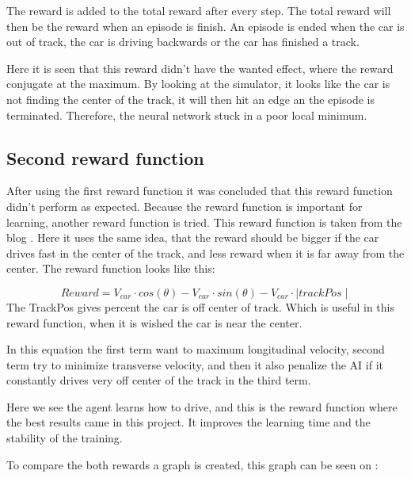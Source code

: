 The reward is added to the total reward after every step. The total reward will then be the reward when an episode is finish. An episode is ended when the car is out of track, the car is driving backwards or the car has finished a track. 

Here it is seen that this reward didn't have the wanted effect, where the reward conjugate at the maximum. By looking at the simulator, it looks like the car is not finding the center of the track, it will then hit an edge an the episode is terminated. Therefore, the neural network stuck in a poor local minimum.  


\subsection*{Second reward function}
After using the first reward function it was concluded that this reward function didn't perform as expected. Because the reward function is important for learning, another reward function is tried. This reward function is taken from the blog \cite{DDPG_Torcs}. Here it uses the same idea, that the reward should be bigger if the car drives fast in the center of the track, and less reward when it is far away from the center. The reward function looks like this:

\begin{equation}
Reward = V_{car} \cdot cos(\theta) - V_{car} \cdot sin(\theta) - V_{car} \cdot \mid trackPos\mid 
\end{equation}
The TrackPos gives percent the car is off center of track. Which is useful in this reward function, when it is wished the car is near the center.  

In this equation the first term want to maximum longitudinal velocity, second term try to minimize transverse velocity, and then it also penalize the AI if it constantly drives very off center of the track in the third term.

Here we see the agent learns how to drive, and this is the reward function where the best results came in this project. It improves the learning time and the stability of the training.

To compare the both rewards a graph is created, this graph can be seen on :

